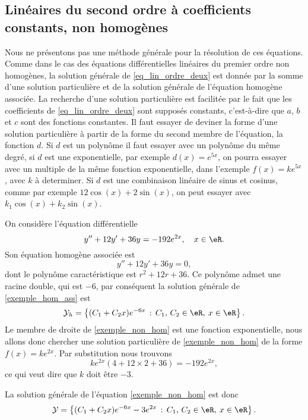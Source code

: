 \subsection{Linéaires du second ordre à coefficients constants, non homogènes}

Nous ne présentons pas une méthode générale pour la résolution de ces équations. Comme dans le cas des équations différentielles linéaires du premier ordre non homogènes, la solution générale de \eqref{eq_lin_ordre_deux} est donnée par la somme d'une solution particulière et de la solution générale de l'équation homogène associée. La recherche d'une solution particulière est facilitée par le fait que les coefficients de \eqref{eq_lin_ordre_deux} sont supposés constants, c'est-à-dire que $a$, $b$ et $c$ sont des fonctions constantes. Il faut essayer de deviner la forme d'une solution particulière à partir de la forme du second membre de l'équation, la fonction $d$. Si $d$ est un polynôme il faut essayer avec un polynôme du même degré, si $d$ est une exponentielle, par exemple $d(x) = e^{5x}$, on pourra essayer avec un multiple de la m\^eme fonction exponentielle, dans l'exemple $f(x) = k e^{5x}$, avec $k$ à determiner. Si $d$ est une combinaison linéaire de sinus et cosinus, comme par exemple $12\cos(x) + 2\sin(x)$, on peut essayer avec $k_1\cos(x) + k_2\sin(x)$.

\begin{example}
	On considère l'équation différentielle
	\begin{equation}\label{exemple_non_hom}
		y'' + 12y' + 36 y = -192 e^{2x}, \quad x\in\eR.
	\end{equation}
	Son équation homogène associée est
	\begin{equation}\label{exemple_hom_ass}
		y'' + 12y' + 36 y = 0,
	\end{equation}
	dont le polynôme caractéristique est $r^2 + 12 r + 36$. Ce polynôme admet une racine double, qui est $-6$, par conséquent la solution générale de \eqref{exemple_hom_ass} est
	\begin{equation*}
		\mathcal{Y}_h  = \left\{(C_1  +C_2x) e^{-6 x} \,:\, C_1,\, C_2 \in \eR, \: x\in \eR\right\}.
	\end{equation*}
	Le membre de droite de \eqref{exemple_non_hom} est une fonction exponentielle, nous allons donc chercher une solution particulière de \eqref{exemple_non_hom} de la forme $f(x) = ke^{2x}$. Par substitution nous trouvons
	\[
		ke^{2x}(4 + 12 \times 2 +36) = -192 e^{2x},
	\]
	ce qui veut dire que $k$ doit \^etre $-3$.

	La solution générale de l'équation \eqref{exemple_non_hom} est donc
	\begin{equation*}
		\mathcal{Y}  = \left\{(C_1  +C_2x) e^{-6 x} -3e^{2x} \,:\, C_1,\, C_2 \in \eR, \: x\in \eR\right\}.
	\end{equation*}
\end{example}

